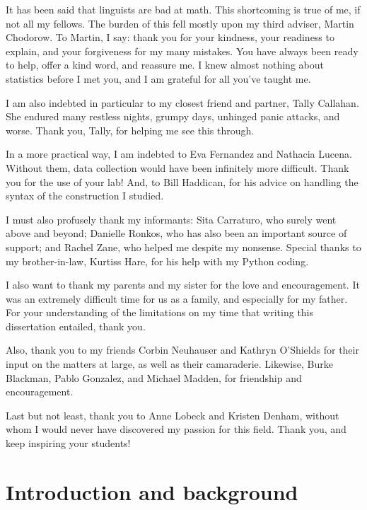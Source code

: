 \documentclass[11pt,oneside]{book}
\begin{document}
It has been said that linguists are bad at math. This shortcoming is true of me, if not all my fellows. The burden of this fell mostly upon my third adviser, Martin Chodorow. To Martin, I say: thank you for your kindness, your readiness to explain, and your forgiveness for my many mistakes. You have always been ready to help, offer a kind word, and reassure me. I knew almost nothing about statistics before I met you, and I am grateful for all you've taught me.

I am also indebted in particular to my closest friend and partner, Tally Callahan. She endured many restless nights, grumpy days, unhinged panic attacks, and worse. Thank you, Tally, for helping me see this through.

In a more practical way, I am indebted to Eva Fernandez and Nathacia Lucena. Without them, data collection would have been infinitely more difficult. Thank you for the use of your lab! And, to Bill Haddican, for his advice on handling the syntax of the construction I studied. 

I must also profusely thank my informants: Sita Carraturo, who surely went above and beyond; Danielle Ronkos, who has also been an important source of support; and Rachel Zane, who helped me despite my nonsense. Special thanks to my brother-in-law, Kurtiss Hare, for his help with my Python coding.

I also want to thank my parents and my sister for the love and encouragement. It was an extremely difficult time for us as a family, and especially for my father. For your understanding of the limitations on my time that writing this dissertation entailed, thank you. 

Also, thank you to my friends Corbin Neuhauser and Kathryn O’Shields for their input on the matters at large, as well as their camaraderie. Likewise, Burke Blackman, Pablo Gonzalez, and Michael Madden, for friendship and encouragement.

Last but not least, thank you to Anne Lobeck and Kristen Denham, without whom I would never have discovered my passion for this field. Thank you, and keep inspiring your students!

\pagebreak

{
\setcounter{tocdepth}{1}
\tableofcontents
}
\listoftables
\listoffigures
\pagebreak

\setlength\parindent{24pt}\setlength{\parskip}{0.0pt plus 1.0pt}


\hypertarget{introduction-and-background}{%
\chapter{Introduction and background}\label{introduction-and-background}}
\end{document}
